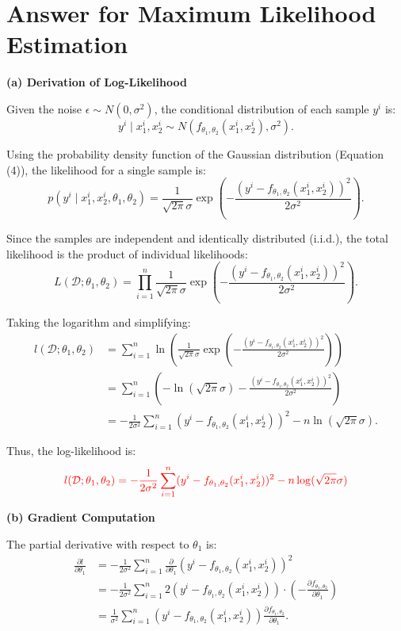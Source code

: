 \section{Answer for Maximum Likelihood Estimation}

\textbf{(a) Derivation of Log-Likelihood}  

Given the noise $\epsilon \sim N(0, \sigma^2)$, the conditional distribution of each sample $y^i$ is:
$$ y^i \mid x^i_1, x^i_2 \sim N\left(f_{\theta_1,\theta_2}(x^i_1, x^i_2), \sigma^2\right). $$

Using the probability density function of the Gaussian distribution (Equation (4)), the likelihood for a single sample is:
$$ p(y^i \mid x^i_1, x^i_2, \theta_1, \theta_2) = \frac{1}{\sqrt{2\pi}\sigma} \exp\left(-\frac{(y^i - f_{\theta_1,\theta_2}(x^i_1, x^i_2))^2}{2\sigma^2}\right). $$

Since the samples are independent and identically distributed (i.i.d.), the total likelihood is the product of individual likelihoods:
$$ L(\mathcal{D}; \theta_1, \theta_2) = \prod_{i=1}^n \frac{1}{\sqrt{2\pi}\sigma} \exp\left(-\frac{(y^i - f_{\theta_1,\theta_2}(x^i_1, x^i_2))^2}{2\sigma^2}\right). $$

Taking the logarithm and simplifying:
$$
\begin{aligned}
l(\mathcal{D}; \theta_1, \theta_2) &= \sum_{i=1}^n \ln\left( \frac{1}{\sqrt{2\pi}\sigma} \exp\left(-\frac{(y^i - f_{\theta_1,\theta_2}(x^i_1, x^i_2))^2}{2\sigma^2}\right) \right) \\
&= \sum_{i=1}^n \left( -\ln(\sqrt{2\pi}\sigma) - \frac{(y^i - f_{\theta_1,\theta_2}(x^i_1, x^i_2))^2}{2\sigma^2} \right) \\
&= -\frac{1}{2\sigma^2} \sum_{i=1}^n (y^i - f_{\theta_1,\theta_2}(x^i_1, x^i_2))^2 - n\ln(\sqrt{2\pi}\sigma).
\end{aligned}
$$

Thus, the log-likelihood is:
\begin{equation*}
    \textcolor{red}{l(\mathcal{D};\theta_1,\theta_2) = -\frac{1}{2\sigma^2}\sum_{i=1}^{n}(y^i-f_{\theta_1,\theta_2}(x^i_1,x^i_2))^2 -n\log(\sqrt{2\pi}\sigma)}
\end{equation*}    


\textbf{(b) Gradient Computation}  

The partial derivative with respect to $\theta_1$ is:
$$
\begin{aligned}
\frac{\partial l}{\partial \theta_1} &= -\frac{1}{2\sigma^2} \sum_{i=1}^n \frac{\partial}{\partial \theta_1} \left( y^i - f_{\theta_1,\theta_2}(x^i_1, x^i_2) \right)^2 \\
&= -\frac{1}{2\sigma^2} \sum_{i=1}^n 2 \left( y^i - f_{\theta_1,\theta_2}(x^i_1, x^i_2) \right) \cdot \left(-\frac{\partial f_{\theta_1,\theta_2}}{\partial \theta_1}\right) \\
&= \frac{1}{\sigma^2} \sum_{i=1}^n \left( y^i - f_{\theta_1,\theta_2}(x^i_1, x^i_2) \right) \frac{\partial f_{\theta_1,\theta_2}}{\partial \theta_1}.
\end{aligned}
$$

